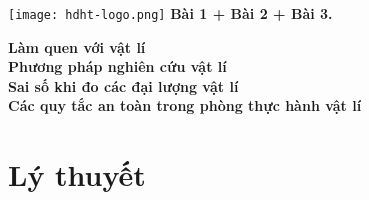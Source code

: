 \newcommand{\chapter}[2][]{
	\newcommand{\chapname}{#2}
	\begin{flushleft}
		\begin{minipage}[t]{\linewidth}
			\texttt{[image: hdht-logo.png]}
			\hspace{0pt}	
			\sffamily\bfseries\large Bài  1 + Bài 2 + Bài 3.
			\begin{flushleft}
				\LARGE\bfseries #1
			\end{flushleft}
		\end{minipage}
	\end{flushleft}
	\vspace{1cm}
	\normalfont\normalsize
}
\chapter[Làm quen với vật lí \\ Phương pháp nghiên cứu vật lí \\ Sai số khi đo các đại lượng vật lí \\ Các quy tắc an toàn trong phòng thực hành vật lí]{Làm quen với vật lí - Phương pháp nghiên cứu vật lí \\ Sai số khi đo các đại lượng vật lí \\Các quy tắc an toàn trong phòng thực hành vật lí}
\section{Lý thuyết}


